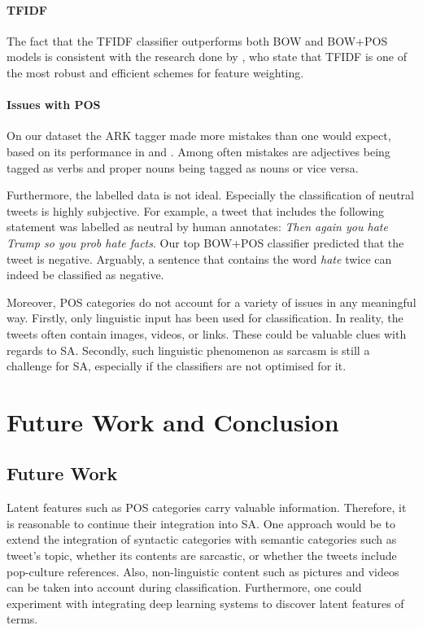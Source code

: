 \documentclass[titlepage]{article}
\begin{document}
      
   \paragraph{TFIDF}
         The fact that the TFIDF classifier outperforms both BOW and BOW+POS models is consistent with the research done by \cite{Wang2018_WordClustering}, who state that TFIDF is one of the most robust and efficient schemes for feature weighting. 
         
      \paragraph{Issues with POS}
         
         On our dataset the ARK tagger made more mistakes than one would expect, based on its performance in \cite{comparison-taggers} and \cite{cmutagger2-paper}. Among often mistakes are adjectives being tagged as verbs and proper nouns being tagged as nouns or vice versa.
         
         Furthermore, the labelled data is not ideal. Especially the classification of neutral tweets is highly subjective. For example, a tweet that includes the following statement was labelled as neutral by human annotates: \textit{Then again you hate Trump so you prob hate facts}. Our top BOW+POS classifier predicted that the tweet is negative. Arguably, a sentence that contains the word \textit{hate} twice can indeed be classified as negative.
         
        Moreover, POS categories do not account for a variety of issues in any meaningful way. Firstly, only linguistic input has been used for classification. In reality, the tweets often contain images, videos, or links. These could be valuable clues with regards to SA. Secondly, such linguistic phenomenon as sarcasm is still a challenge for SA, especially if the classifiers are not optimised for it. 
   

      		
   \section{Future Work and Conclusion}
   
   \subsection{Future Work}
   Latent features such as POS categories carry valuable information. Therefore, it is reasonable to continue their integration into SA. One approach would be to extend the integration of syntactic categories with semantic categories such as tweet's topic, whether its contents are sarcastic, or whether the tweets include pop-culture references. Also, non-linguistic content such as pictures and videos can be taken into account during classification.
   Furthermore, one could experiment with integrating deep learning systems to discover latent features of terms.
   
\end{document}
